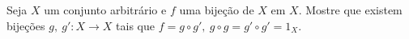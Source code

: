 Seja \(X\) um conjunto arbitrário e \(f\) uma bijeção de \(X\) em \(X\). Mostre que existem bijeções \(g,\ g'\colon X\to X\) tais que \(f=g\circ g',\ g\circ g=g'\circ g'=1_X\).
